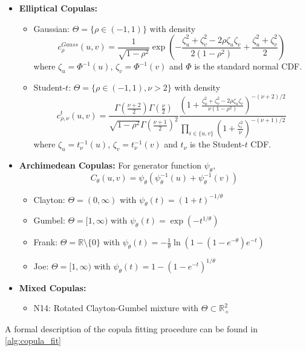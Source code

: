 \begin{itemize}
\item \textbf{Elliptical Copulas:}
   \begin{itemize}
   \item Gaussian: $\Theta = \{\rho \in (-1,1)\}$ with density
   \[
   c_\rho^{Gauss}(u,v) = \frac{1}{\sqrt{1-\rho^2}} \exp\left(-\frac{\zeta_u^2 + \zeta_v^2 - 2\rho\zeta_u\zeta_v}{2(1-\rho^2)} + \frac{\zeta_u^2 + \zeta_v^2}{2}\right)
   \]
   where $\zeta_u = \Phi^{-1}(u)$, $\zeta_v = \Phi^{-1}(v)$ and $\Phi$ is the standard normal CDF.
   
   \item Student-$t$: $\Theta = \{\rho \in (-1,1), \nu > 2\}$ with density
   \[
   c_{\rho,\nu}^{t}(u,v) = \frac{\Gamma\left(\frac{\nu+2}{2}\right)\Gamma\left(\frac{\nu}{2}\right)}{\sqrt{1-\rho^2}\Gamma\left(\frac{\nu+1}{2}\right)^2} 
   \frac{\left(1 + \frac{\zeta_u^2 + \zeta_v^2 - 2\rho\zeta_u\zeta_v}{\nu(1-\rho^2)}\right)^{-(\nu+2)/2}}{\prod_{i\in\{u,v\}} \left(1 + \frac{\zeta_i^2}{\nu}\right)^{-(\nu+1)/2}}
   \]
   where $\zeta_u = t_\nu^{-1}(u)$, $\zeta_v = t_\nu^{-1}(v)$ and $t_\nu$ is the Student-$t$ CDF.
   \end{itemize}	

\item \textbf{Archimedean Copulas:} For generator function $\psi_\theta$, 
\[
C_\theta(u,v) = \psi_\theta(\psi_\theta^{-1}(u) + \psi_\theta^{-1}(v))
\]
    \begin{itemize}
    \item Clayton: $\Theta = (0, \infty)$ with $\psi_\theta(t) = (1 + t)^{-1/\theta}$
    \item Gumbel: $\Theta = [1, \infty)$ with $\psi_\theta(t) = \exp(-t^{1/\theta})$
    \item Frank: $\Theta = \mathbb{R}\setminus\{0\}$ with $\psi_\theta(t) = -\frac{1}{\theta}\ln\left(1 - (1 - e^{-\theta})e^{-t}\right)$
    \item Joe: $\Theta = [1, \infty)$ with $\psi_\theta(t) = 1 - (1 - e^{-t})^{1/\theta}$
    \end{itemize}

\item \textbf{Mixed Copulas:}
    \begin{itemize}
    \item N14: Rotated Clayton-Gumbel mixture with $\Theta \subset \mathbb{R}^2_+$
    \end{itemize}
\end{itemize}

A formal description of the copula fitting procedure can be found in \cref{alg:copula_fit}

